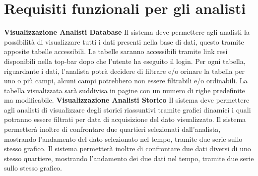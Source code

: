     \section{Requisiti funzionali per gli analisti}
        \begin{rfList}
            \rfItem \textbf{Visualizzazione Analisti Database} Il sistema deve permettere agli analisti la possibilità di visualizzare tutti i dati presenti nella base di dati, questo tramite apposite tabelle accessibili. Le tabelle saranno accessibili tramite link resi disponibili nella top-bar dopo che l'utente ha eseguito il login. Per ogni tabella, riguardante i dati, l'analista potrà decidere di filtrare e/o orinare la tabella per uno o più campi, alcuni campi potrebbero non essere filtrabili e/o ordinabili. La tabella visualizzata sarà suddivisa in pagine con un numero di righe predefinite ma modificabile.
            \rfItem \textbf{Visualizzazione Analisti Storico} Il sistema deve permettere agli analisti di visualizzare degli storici riassuntivi tramite grafici dinamici i quali potranno essere filtrati per data di acquisizione del dato visualizzato. Il sistema permetterà inoltre di confrontare due quartieri selezionati dall'analista, mostrando l'andamento del dato selezionato nel tempo, tramite due serie sullo stesso grafico. Il sistema permetterà inoltre di confrontare due dati diversi di uno stesso quartiere, mostrando l'andamento dei due dati nel tempo, tramite due serie sullo stesso grafico. 
        \end{rfList}
